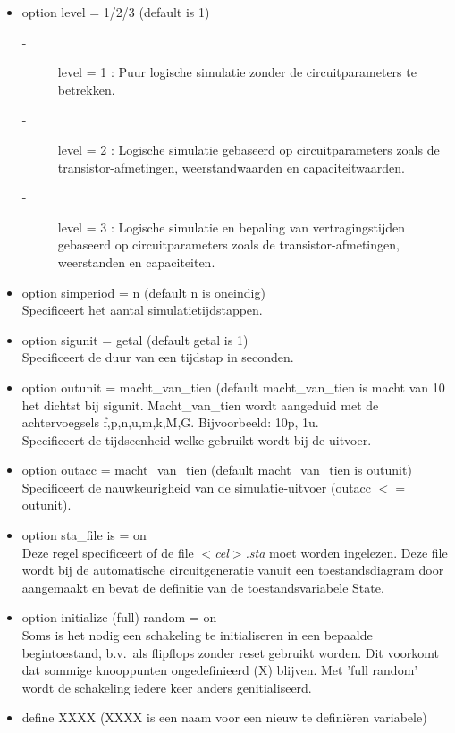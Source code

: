 \begin{itemize}
\item
option level = 1/2/3 (default is 1)
\begin{description}
\item[-] level = 1 : Puur logische simulatie zonder de circuitparameters te betrekken.
\item[-] level = 2 : Logische simulatie gebaseerd op circuitparameters zoals de 
transistor-afmetingen, weerstandwaarden en capaciteitwaarden.
\item[-] level = 3 : Logische simulatie en bepaling van vertragingstijden gebaseerd 
op circuitparameters zoals de transistor-afmetingen, weerstanden en capaciteiten.
\end{description}
\item
option simperiod = n (default n is oneindig)\\
Specificeert het aantal simulatietijdstappen.
\item
option sigunit = getal (default getal is 1)\\
Specificeert de duur van een tijdstap in seconden.
\item
option outunit = macht\_van\_tien (default macht\_van\_tien is macht van 10 het dichtst bij sigunit. Macht\_van\_tien wordt aangeduid met de 
achtervoegsels f,p,n,u,m,k,M,G.
Bijvoorbeeld: 10p, 1u.\\
Specificeert de tijdseenheid welke gebruikt wordt bij de uitvoer.
\item
option outacc = macht\_van\_tien (default macht\_van\_tien is outunit)\\
Specificeert de nauwkeurigheid van de simulatie-uitvoer (outacc $<=$ outunit).
\item
option sta\_file is = on\\
Deze regel specificeert of de file {\it $<$cel$>$.sta} moet worden ingelezen.
Deze file wordt bij de automatische circuitgeneratie vanuit een toestandsdiagram door  aangemaakt en bevat de definitie van de 
toestandsvariabele State.
\item
option initialize (full) random = on\\
Soms is het nodig een schakeling te initialiseren in een bepaalde begintoestand,
b.v.\ als flipflops zonder reset gebruikt worden.
Dit voorkomt dat sommige knooppunten ongedefinieerd (X) blijven.
Met 'full random' wordt de schakeling iedere keer anders ge{\ii}nitialiseerd.
\item
define XXXX (XXXX is een naam voor een nieuw te defini\"eren variabele)\\

\end{itemize}
